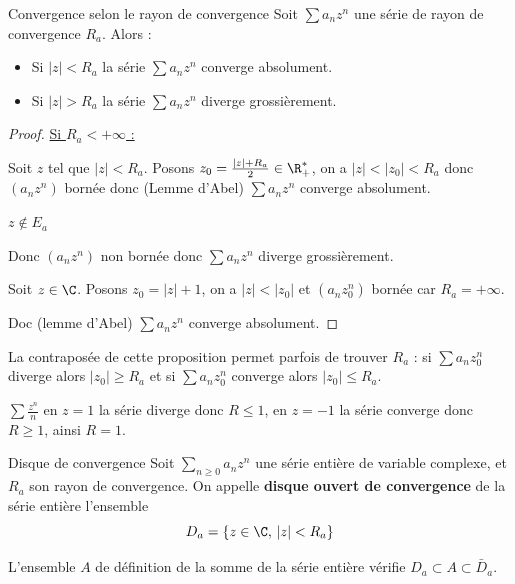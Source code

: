 \begin{proposition}{Convergence selon le rayon de convergence}{}
    Soit $\sum a_n z^n$ une série de rayon de convergence $R_a$. Alors : 
    \begin{itemize}
        \item Si $|z| < R_a$ la série $\sum a_n z^n$ converge absolument.
        \item Si $|z| > R_a$ la série $\sum a_n z^n$ diverge grossièrement.
    \end{itemize}
\end{proposition}


\begin{proof} \uline{Si $R_a < +\infty$ :}

    Soit $z$ tel que $|z| < R_a$. 
    Posons $z_0 = \frac{|z| + R_a}{2} \in \R_+^*$, on a $|z| < |z_0| < R_a$ donc 
    $(a_n z^n)$ bornée donc (Lemme d'Abel) $\sum a_n z^n$ converge absolument.

     $z \notin E_a$ 

    \svspace Donc $(a_n z^n)$ non bornée donc $\sum a_n z^n$ diverge grossièrement.


    \svspace Soit $z \in \C$. Posons $z_0 = |z| + 1$, on a $|z| < |z_0|$ et $(a_nz_0^n)$ bornée car $R_a = + \infty$. 

    Doc (lemme d'Abel) $\sum a_n z^n$ converge absolument.
\end{proof}

\begin{remarque}
    La contraposée de cette proposition permet parfois de trouver $R_a$ : 
    si $\sum a_n z_0^n$ diverge alors $|z_0| \geqslant R_a$ et si $\sum a_n z_0^n$ converge 
    alors $|z_0| \leqslant R_a$.
\end{remarque}

\begin{exemple}
    $\sum \frac{z^n} n$ en $z = 1$ la série diverge donc $R \leqslant 1$, en $z = - 1$ la série 
    converge donc $R \geqslant 1$, ainsi $R = 1$.
\end{exemple}


\begin{definition}{Disque de convergence}{}
    Soit $\sum_{n \geqslant 0} a_n z^n$ une série entière de variable complexe, et $R_a$ 
    son rayon de convergence. On appelle \textbf{disque ouvert de convergence} de la série entière 
    l'ensemble 
    $$D_a = \{z \in \C, \, |z| < R_a \}$$

    L'ensemble $A$ de définition de la somme de la série entière vérifie $D_a \subset A \subset \bar D_a$.
\end{definition}

